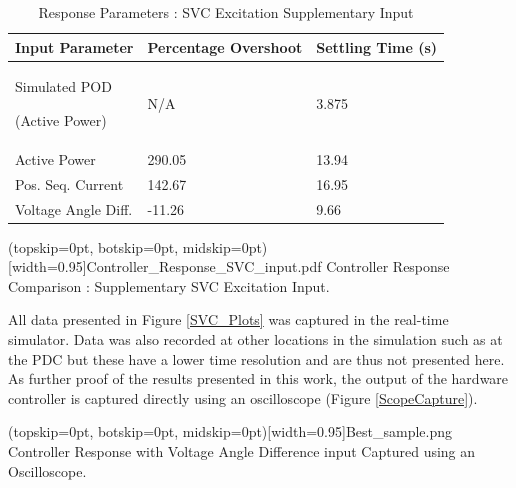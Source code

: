 \documentclass{ieeeaccess}
\begin{document}
\begin{table}[!ht]
\caption{Response Parameters : SVC Excitation Supplementary Input}\label{SVCResponseTable}

\begin{center}
\begin{tabular}{|p{80pt}|p{60pt}|p{60pt}|}

\hline \textbf{Input Parameter} & \textbf{Percentage Overshoot} & \textbf{Settling Time (s)} \\
\hline Simulated POD \par (Active Power)& N/A & 3.875 \\ 
\hline Active Power & 290.05 & 13.94 \\ 
\hline Pos. Seq. Current & 142.67 & 16.95\\ 
\hline Voltage Angle Diff. & -11.26 & 9.66\\ 
\hline 

\end{tabular}

\end{center}

\end{table}  

\Figure[tbp!](topskip=0pt, botskip=0pt, midskip=0pt)[width=0.95\columnwidth]{Controller_Response_SVC_input.pdf}
{Controller Response Comparison : Supplementary SVC Excitation Input.\label{SVC_Plots}}

All data presented in Figure \ref{SVC_Plots} was captured in the real-time simulator. Data was also recorded at other locations in the simulation such as at the PDC but these have a lower time resolution and are thus not presented here. As further proof of the results presented in this work, the output of the hardware controller is captured directly using an oscilloscope (Figure \ref{ScopeCapture}).

\Figure[tbp!](topskip=0pt, botskip=0pt, midskip=0pt)[width=0.95\columnwidth]{Best_sample.png}
{Controller Response with Voltage Angle Difference input Captured using an Oscilloscope.\label{ScopeCapture}}
\end{document}
